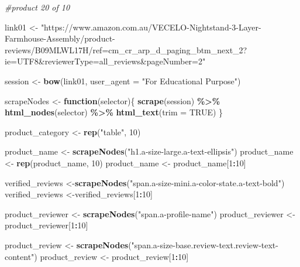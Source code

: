 \documentclass[
]{article}
\newenvironment{Shaded}{\begin{snugshade}}{\end{snugshade}}
\newcommand{\AttributeTok}[1]{\textcolor[rgb]{0.13,0.29,0.53}{#1}}
\newcommand{\CommentTok}[1]{\textcolor[rgb]{0.56,0.35,0.01}{\textit{#1}}}
\newcommand{\ConstantTok}[1]{\textcolor[rgb]{0.56,0.35,0.01}{#1}}
\newcommand{\ControlFlowTok}[1]{\textcolor[rgb]{0.13,0.29,0.53}{\textbf{#1}}}
\newcommand{\DecValTok}[1]{\textcolor[rgb]{0.00,0.00,0.81}{#1}}
\newcommand{\FunctionTok}[1]{\textcolor[rgb]{0.13,0.29,0.53}{\textbf{#1}}}
\newcommand{\NormalTok}[1]{#1}
\newcommand{\OtherTok}[1]{\textcolor[rgb]{0.56,0.35,0.01}{#1}}
\newcommand{\SpecialCharTok}[1]{\textcolor[rgb]{0.81,0.36,0.00}{\textbf{#1}}}
\newcommand{\StringTok}[1]{\textcolor[rgb]{0.31,0.60,0.02}{#1}}
\begin{document}
\begin{Shaded}
\begin{Highlighting}[]
\CommentTok{\#product 20 of 10}

\NormalTok{link01 }\OtherTok{\textless{}{-}} \StringTok{"https://www.amazon.com.au/VECELO{-}Nightstand{-}3{-}Layer{-}Farmhouse{-}Assembly/product{-}reviews/B09MLWL17H/ref=cm\_cr\_arp\_d\_paging\_btm\_next\_2?ie=UTF8\&reviewerType=all\_reviews\&pageNumber=2"}


\NormalTok{  session }\OtherTok{\textless{}{-}} \FunctionTok{bow}\NormalTok{(link01,}
               \AttributeTok{user\_agent =} \StringTok{"For Educational Purpose"}\NormalTok{)}

\NormalTok{  scrapeNodes }\OtherTok{\textless{}{-}} \ControlFlowTok{function}\NormalTok{(selector)\{}
    \FunctionTok{scrape}\NormalTok{(session) }\SpecialCharTok{\%\textgreater{}\%}
      \FunctionTok{html\_nodes}\NormalTok{(selector) }\SpecialCharTok{\%\textgreater{}\%}
      \FunctionTok{html\_text}\NormalTok{(}\AttributeTok{trim =} \ConstantTok{TRUE}\NormalTok{)}
\NormalTok{  \}}

\NormalTok{  product\_category }\OtherTok{\textless{}{-}} \FunctionTok{rep}\NormalTok{(}\StringTok{"table"}\NormalTok{, }\DecValTok{10}\NormalTok{)}

\NormalTok{  product\_name }\OtherTok{\textless{}{-}} \FunctionTok{scrapeNodes}\NormalTok{(}\StringTok{"h1.a{-}size{-}large.a{-}text{-}ellipsis"}\NormalTok{)}
\NormalTok{  product\_name }\OtherTok{\textless{}{-}} \FunctionTok{rep}\NormalTok{(product\_name, }\DecValTok{10}\NormalTok{)}
\NormalTok{  product\_name }\OtherTok{\textless{}{-}}\NormalTok{ product\_name[}\DecValTok{1}\SpecialCharTok{:}\DecValTok{10}\NormalTok{]}
  
\NormalTok{  verified\_reviews }\OtherTok{\textless{}{-}}\FunctionTok{scrapeNodes}\NormalTok{(}\StringTok{"span.a{-}size{-}mini.a{-}color{-}state.a{-}text{-}bold"}\NormalTok{)}
\NormalTok{  verified\_reviews }\OtherTok{\textless{}{-}}\NormalTok{verified\_reviews[}\DecValTok{1}\SpecialCharTok{:}\DecValTok{10}\NormalTok{]}
  
\NormalTok{  product\_reviewer }\OtherTok{\textless{}{-}} \FunctionTok{scrapeNodes}\NormalTok{(}\StringTok{"span.a{-}profile{-}name"}\NormalTok{)}
\NormalTok{  product\_reviewer }\OtherTok{\textless{}{-}}\NormalTok{ product\_reviewer[}\DecValTok{1}\SpecialCharTok{:}\DecValTok{10}\NormalTok{]}
  
\NormalTok{  product\_review }\OtherTok{\textless{}{-}} \FunctionTok{scrapeNodes}\NormalTok{(}\StringTok{"span.a{-}size{-}base.review{-}text.review{-}text{-}content"}\NormalTok{)}
\NormalTok{  product\_review }\OtherTok{\textless{}{-}}\NormalTok{ product\_review[}\DecValTok{1}\SpecialCharTok{:}\DecValTok{10}\NormalTok{]}
  

\end{Highlighting}
\end{Shaded}
\end{document}
